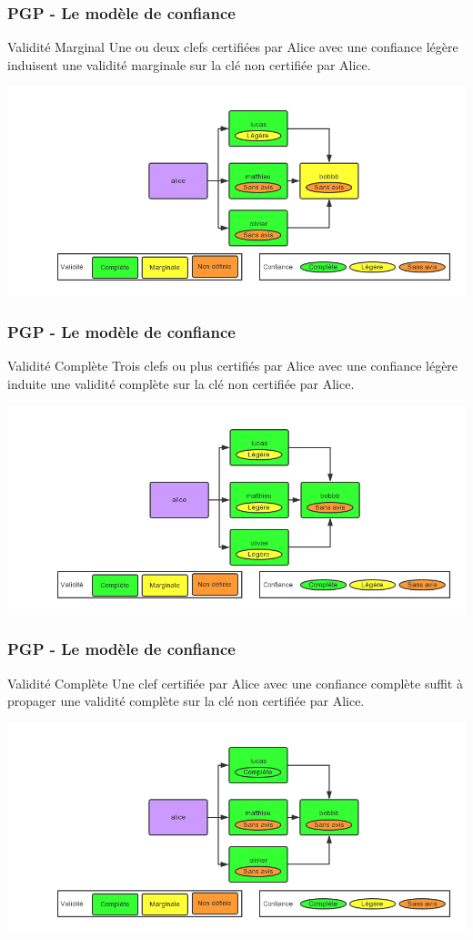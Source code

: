 \begin{frame}
  \frametitle{\color{white}PGP - Le modèle de confiance}
    \begin{block}{Validité Marginal}
      Une ou deux clefs certifiées par Alice avec une confiance légère 
      induisent une validité marginale sur la clé non certifiée par Alice.
    \end{block}
    \includegraphics[scale=0.3]{tdcdemoMarginal.png}
\end{frame}
\begin{frame}
  \frametitle{\color{white}PGP - Le modèle de confiance}
    \begin{block}{Validité Complète}
      Trois clefs ou plus certifiés par Alice avec une confiance légère
      induite une validité complète sur la clé non certifiée par Alice.
    \end{block}
    \includegraphics[scale=0.3]{tdcdemoComplete1.png}
\end{frame}
\begin{frame}
  \frametitle{\color{white}PGP - Le modèle de confiance}
    \begin{block}{Validité Complète}
      Une clef certifiée par Alice avec une confiance complète
      suffit à propager une validité complète sur la clé non certifiée par Alice.
    \end{block}
    \includegraphics[scale=0.3]{tdcdemoComplete2.png}
\end{frame}

